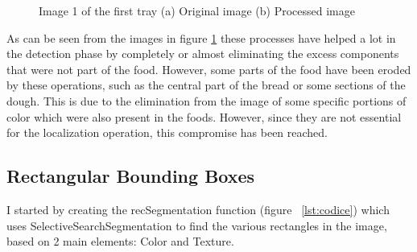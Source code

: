 \documentclass[
	a4paper, %
	10pt, %
	unnumberedsections, %
	twoside, %
]{LTJournalArticle}
\begin{document}
\begin{figure}
    \centering
    \caption{Image 1 of the first tray (a) Original image (b) Processed image}
    \label{fig:prepcompare}
\end{figure}

As can be seen from the images in figure \ref{fig:prepcompare} these processes have helped a lot in the detection phase by completely or almost eliminating the excess components that were not part of the food. However, some parts of the food have been eroded by these operations, such as the central part of the bread or some sections of the dough. This is due to the elimination from the image of some specific portions of color which were also present in the foods. However, since they are not essential for the localization operation, this compromise has been reached.

\subsection{Rectangular Bounding Boxes}
I started by creating the recSegmentation function (figure \lstlistingname~\ref{lst:codice}) which uses SelectiveSearchSegmentation to find the various rectangles in the image, based on 2 main elements: Color and Texture.
\end{document}
